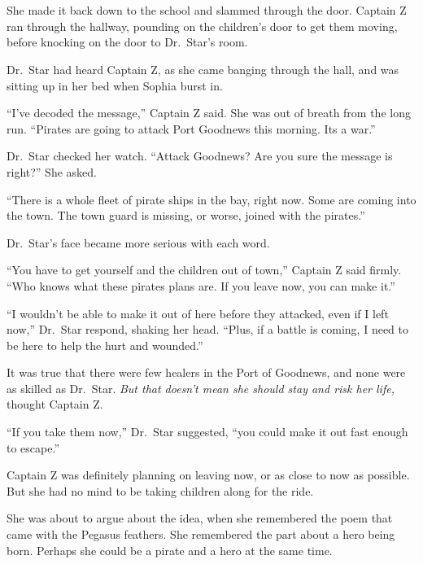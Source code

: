 \documentclass[12pt]{extbook}
\begin{document}
  \section{}\label{section-37}
  
  She made it back down to the school and slammed through the door.
  Captain Z ran through the hallway, pounding on the children's door to
  get them moving, before knocking on the door to Dr.~Star's room.
  
  Dr.~Star had heard Captain Z, as she came banging through the hall, and
  was sitting up in her bed when Sophia burst in.
  
  \enquote{I've decoded the message,} Captain Z said. She was out of
  breath from the long run. \enquote{Pirates are going to attack Port
  Goodnews this morning. Its a war.}
  
  Dr.~Star checked her watch. \enquote{Attack Goodnews? Are you sure the
  message is right?} She asked.
  
  \enquote{There is a whole fleet of pirate ships in the bay, right now.
  Some are coming into the town. The town guard is missing, or worse,
  joined with the pirates.}
  
  Dr.~Star's face became more serious with each word.
  
  \enquote{You have to get yourself and the children out of town,} Captain
  Z said firmly. \enquote{Who knows what these pirates plans are. If you
  leave now, you can make it.}
  
  \enquote{I wouldn't be able to make it out of here before they attacked,
  even if I left now,} Dr.~Star respond, shaking her head. \enquote{Plus,
  if a battle is coming, I need to be here to help the hurt and wounded.}
  
  It was true that there were few healers in the Port of Goodnews, and
  none were as skilled as Dr.~Star. \emph{But that doesn't mean she should
  stay and risk her life,} thought Captain Z.
  
  \enquote{If you take them now,} Dr.~Star suggested, \enquote{you could
  make it out fast enough to escape.}
  
  Captain Z was definitely planning on leaving now, or as close to now as
  possible. But she had no mind to be taking children along for the ride.
  
  She was about to argue about the idea, when she remembered the poem that
  came with the Pegasus feathers. She remembered the part about a hero
  being born. Perhaps she could be a pirate and a hero at the same time.
  
\end{document}
